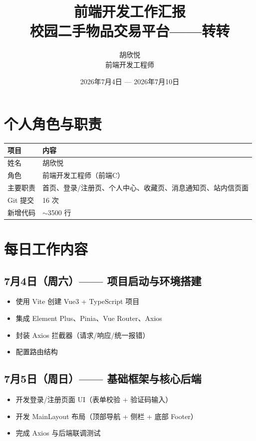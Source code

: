 \documentclass[12pt,a4paper]{ctexart}
\title{{\Huge 前端开发工作汇报}\\[0.3cm]{\Large 校园二手物品交易平台——转转}}
\author{{\large 胡欣悦}\\{\small 前端开发工程师}}
\date{2026年7月4日 — 2026年7月10日}
\begin{document}
\maketitle
\thispagestyle{fancy}

\section{个人角色与职责}

\begin{table}[H]
\centering
\begin{tabular}{lp{10cm}}
\toprule
\textbf{项目} & \textbf{内容} \\
\midrule
姓名 & 胡欣悦 \\
角色 & 前端开发工程师（前端C） \\
主要职责 & 首页、登录/注册页、个人中心、收藏页、消息通知页、站内信页面 \\
Git 提交 & 16 次 \\
新增代码 & $\sim$3500 行 \\
\bottomrule
\end{tabular}
\end{table}

\section{每日工作内容}

\subsection{7月4日（周六）—— 项目启动与环境搭建}
\begin{itemize}
    \item 使用 Vite 创建 Vue3 + TypeScript 项目
    \item 集成 Element Plus、Pinia、Vue Router、Axios
    \item 封装 Axios 拦截器（请求/响应/统一报错）
    \item 配置路由结构
\end{itemize}

\subsection{7月5日（周日）—— 基础框架与核心后端}
\begin{itemize}
    \item 开发登录/注册页面 UI（表单校验 + 验证码输入）
    \item 开发 MainLayout 布局（顶部导航 + 侧栏 + 底部 Footer）
    \item 完成 Axios 与后端联调测试
\end{itemize}
\end{document}
